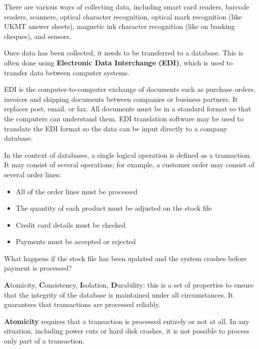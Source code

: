 \documentclass[../main.tex]{subfile}
\begin{document}


There are various ways of collecting data, including smart card readers, barcode readers, scanners, optical character recognition, optical mark recognition (like UKMT answer sheets), magnetic ink character recognition (like on banking cheques), and sensors.

Once data has been collected, it needs to be transferred to a database. This is often done using \textbf{Electronic Data Interchange (EDI)}, which is used to transfer data between computer systems.


EDI is the computer-to-computer exchange of documents such as purchase orders, invoices and shipping documents between companies or business partners. It replaces post, email, or fax. All documents must be in a standard format so that the computers can understand them. EDI translation software may be used to translate the EDI format so the data can be input directly to a company database.


In the context of databases, a single logical operation is defined as a transaction. It may consist of several operations; for example, a customer order may consist of several order lines:
\begin{itemize}
	\item All of the order lines must be processed
	\item The quantity of each product must be adjusted on the stock file
	\item Credit card details must be checked
	\item Payments must be accepted or rejected
\end{itemize}

What happens if the stock file has been updated and the system crashes before payment is processed?


\textbf{A}tomicity, \textbf{C}onsistency, \textbf{I}solation, \textbf{D}urability: this is a set of properties to ensure that the integrity of the database is maintained under all circumstances. It guarantees that transactions are processed reliably.

\textbf{Atomicity} requires that a transaction is processed entirely or not at all. In any situation, including power cuts or hard disk crashes, it is not possible to process only part of a transaction.
\end{document}
